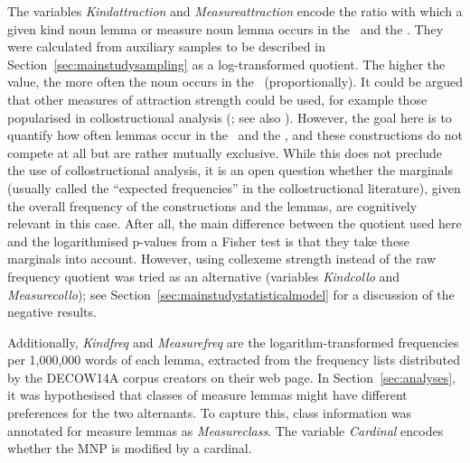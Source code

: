 The variables \textit{Kindattraction} and \textit{Measureattraction} encode the ratio with which a given kind noun lemma or measure noun lemma occurs in the \PGCd\ and the \NACb.
They were calculated from auxiliary samples to be described in Section~\ref{sec:mainstudysampling} as a log-transformed quotient.
The higher the value, the more often the noun occurs in the \PGCd\ (proportionally).
It could be argued that other measures of attraction strength could be used, for example those popularised in collostructional analysis (\citealp{StefanowitschGries2003,GriesStefanowitsch2004}; see also \citealp{Gries2015a}).
However, the goal here is to quantify how often lemmas occur in the \PGCd\ and the \NACb, and these constructions do not compete at all but are rather mutually exclusive.
While this does not preclude the use of collostructional analysis, it is an open question whether the marginals (usually called the ``expected frequencies'' in the collostructional literature), given the overall frequency of the constructions and the lemmas, are cognitively relevant in this case.
After all, the main difference between the quotient used here and the logarithmised p-values from a Fisher test is that they take these marginals into account. 
However, using collexeme strength instead of the raw frequency quotient was tried as an alternative (variables \textit{Kindcollo} and \textit{Measurecollo}); see Section~\ref{sec:mainstudystatisticalmodel} for a discussion of the negative results.

Additionally, \textit{Kindfreq} and \textit{Measurefreq} are the logarithm-transformed frequencies per 1,000,000 words of each lemma, extracted from the frequency lists distributed by the DECOW14A corpus creators on their web page.
In Section~\ref{sec:analyses}, it was hypothesised that classes of measure lemmas might have different preferences for the two alternants.
To capture this, class information was annotated for measure lemmas as \textit{Measureclass}.
The variable \textit{Cardinal} encodes whether the MNP is modified by a cardinal.

